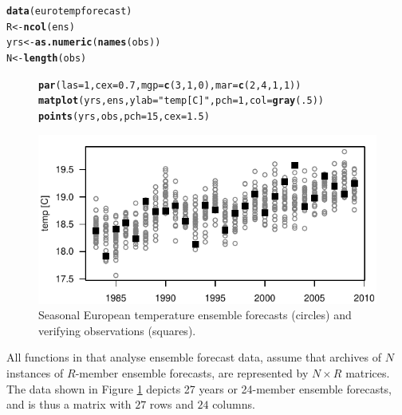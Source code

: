 \documentclass[article]{jss}\usepackage{graphicx, color}
\makeatletter
\def\maxwidth{ %
  \ifdim\Gin@nat@width>\linewidth
    \linewidth
  \else
    \Gin@nat@width
  \fi
}
\newcommand{\hlfunctioncall}[1]{\textcolor[rgb]{0,0.501960784313725,0.752941176470588}{\textbf{#1}}}%
\newcommand{\hlstring}[1]{\textcolor[rgb]{0.650980392156863,0.52156862745098,0}{#1}}%
\newenvironment{kframe}{%
 \def\at@end@of@kframe{}%
 \ifinner\ifhmode%
  \def\at@end@of@kframe{\end{minipage}}%
  \begin{minipage}{\columnwidth}%
 \fi\fi%
 \def\FrameCommand##1{\hskip\@totalleftmargin \hskip-\fboxsep
 \colorbox{shadecolor}{##1}\hskip-\fboxsep
     \hskip-\linewidth \hskip-\@totalleftmargin \hskip\columnwidth}%
 \MakeFramed {\advance\hsize-\width
   \@totalleftmargin\z@ \linewidth\hsize
   \@setminipage}}%
 {\par\unskip\endMakeFramed%
 \at@end@of@kframe}
\newenvironment{knitrout}{}{} %
\makeatother
\begin{document}
\begin{knitrout}
\color{fgcolor}\begin{kframe}
\begin{alltt}
\hlfunctioncall{data}(eurotempforecast)
R   <- \hlfunctioncall{ncol}(ens)
yrs <- \hlfunctioncall{as.numeric}(\hlfunctioncall{names}(obs))
N   <- \hlfunctioncall{length}(obs)
\end{alltt}
\end{kframe}
\end{knitrout}




\begin{figure}
\begin{center}
%
\begin{knitrout}
\color{fgcolor}\begin{kframe}
\begin{alltt}
\hlfunctioncall{par}(las=1, cex=0.7, mgp=\hlfunctioncall{c}(3, 1, 0), mar=\hlfunctioncall{c}(2,4,1,1))
\hlfunctioncall{matplot}(yrs, ens, ylab=\hlstring{"temp [C]"}, pch=1, col=\hlfunctioncall{gray}(.5))
\hlfunctioncall{points}(yrs, obs, pch=15, cex=1.5)
\end{alltt}
\end{kframe}
\includegraphics[width=\maxwidth]{figure/gfs-plot} 

\end{knitrout}

%
\end{center}
\caption{Seasonal European temperature ensemble forecasts (circles) and verifying observations (squares).}
\label{gfs-plot}
\end{figure}


All functions in  that analyse ensemble forecast data, assume that archives of $N$ instances of $R$-member ensemble forecasts, are represented by $N\times R$ matrices.
The data shown in Figure \ref{gfs-plot} depicts 27 years or 24-member ensemble forecasts, and is thus a  matrix with $27$ rows and $24$ columns.
\end{document}
